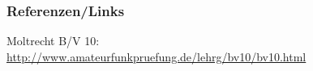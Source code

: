\renewcommand{\refname}{Referenzen}

\begin{frame}
    \frametitle{Referenzen/Links}
    \hypertarget{refs}{}
    \footnotesize

    \begin{thebibliography}{}
         Moltrecht B/V 10: \\
                        \url{http://www.amateurfunkpruefung.de/lehrg/bv10/bv10.html}
    \end{thebibliography} 
   
\end{frame}


